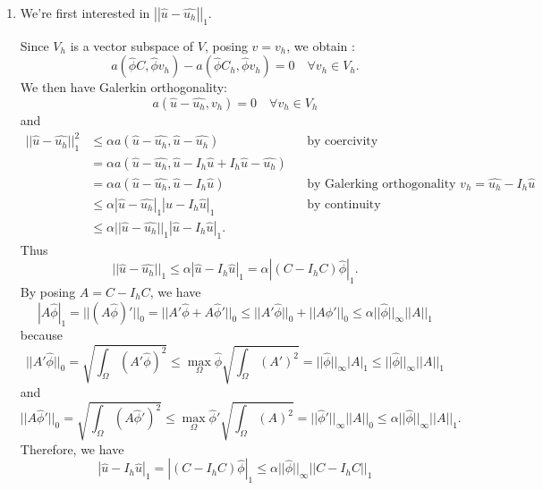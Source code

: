 \begin{enumerate}[label=\textbullet]
	\item  We're first interested in $\left|\left|\hat{u}-\hat{u_h}\right|\right|_1$.
	
	Since  $V_h$ is a vector subspace of  $V$, posing $v=v_h$, we obtain :
	\begin{equation*}
		a(\hat{\phi}C,\hat{\phi}v_h)-a(\hat{\phi}C_h,\hat{\phi}v_h)=0 \quad \forall v_h\in V_h.
	\end{equation*}
	We then have Galerkin orthogonality:
	\begin{equation*}
		a(\hat{u}-\hat{u_h},v_h)=0 \quad \forall v_h\in V_h
	\end{equation*}
	and
	\begin{align*}
		||\hat{u}-\hat{u_h}||_1^2&\le\alpha a(\hat{u}-\hat{u_h},\hat{u}-\hat{u_h}) &&\text{by coercivity} \\
		&=\alpha a(\hat{u}-\hat{u_h},\hat{u}-I_h\hat{u}+I_h\hat{u}-\hat{u_h}) \\
		&=\alpha a(\hat{u}-\hat{u_h},\hat{u}-I_h\hat{u}) &&\text{by Galerking orthogonality taking } v_h=\hat{u_h}-I_h\hat{u} \\
		&\le\alpha |\hat{u}-\hat{u_h}|_1|\hat{u}-I_h\hat{u}|_1 &&\text{by continuity} \\
		&\le\alpha ||\hat{u}-\hat{u_h}||_1|\hat{u}-I_h\hat{u}|_1.
	\end{align*}
	Thus
	\begin{equation*}
		||\hat{u}-\hat{u_h}||_1\le\alpha|\hat{u}-I_h\hat{u}|_1=\alpha|(C-I_hC)\hat{\phi}|_1.
	\end{equation*}
	By posing $A=C-I_hC$, we have
	\begin{equation*}
		|A\hat{\phi}|_1=||(A\hat{\phi})'||_0=||A'\hat{\phi}+A\hat{\phi}'||_0\le||A'\hat{\phi}||_0+||A\hat{\phi}'||_0\le\alpha ||\hat{\phi}||_\infty||A||_1
	\end{equation*}
	because
	\begin{equation*}
		||A'\hat{\phi}||_0=\sqrt{\int_\Omega(A'\hat{\phi})^2}\le \max_\Omega \hat{\phi}\sqrt{\int_\Omega(A')^2}=||\hat{\phi}||_\infty|A|_1\le||\hat{\phi}||_\infty||A||_1
	\end{equation*}
	and
	\begin{equation*}
		||A\hat{\phi}'||_0=\sqrt{\int_\Omega(A\hat{\phi}')^2}\le \max_\Omega \hat{\phi}'\sqrt{\int_\Omega(A)^2}=||\hat{\phi}'||_\infty||A||_0\le \alpha||\hat{\phi}||_\infty||A||_1.
	\end{equation*}
	Therefore, we have
	\begin{equation*}
		|\hat{u}-I_h\hat{u}|_1=|(C-I_hC)\hat{\phi}|_1\le\alpha ||\hat{\phi}||_\infty||C-I_hC||_1
	\end{equation*}
	

\end{enumerate}
